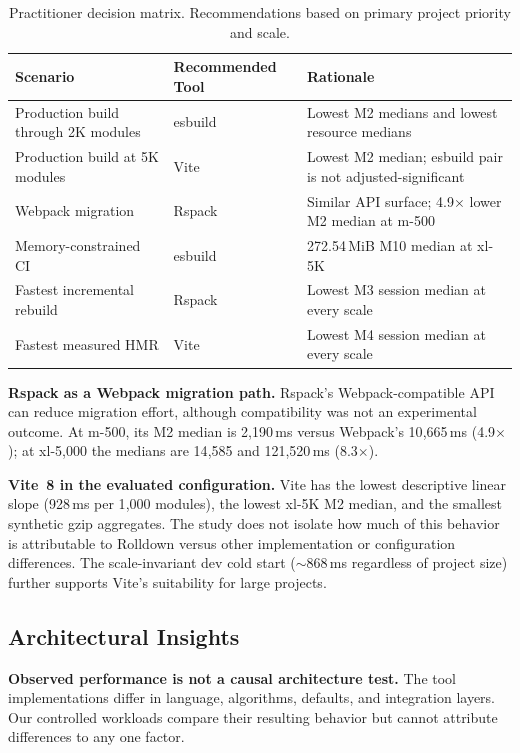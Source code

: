 \documentclass[preprint,12pt]{elsarticle}
\begin{document}
\begin{table}[htbp]
\centering
\caption{Practitioner decision matrix. Recommendations based on primary project priority and scale.}\label{tab:decision}
\begin{tabular}{@{}lll@{}}
\toprule
\textbf{Scenario} & \textbf{Recommended Tool} & \textbf{Rationale} \\
\midrule
Production build through 2K modules & esbuild & Lowest M2 medians and lowest resource medians \\
Production build at 5K modules & Vite & Lowest M2 median; esbuild pair is not adjusted-significant \\
Webpack migration & Rspack & Similar API surface; 4.9$\times$ lower M2 median at m-500 \\
Memory-constrained CI & esbuild & 272.54\,MiB M10 median at xl-5K \\
Fastest incremental rebuild & Rspack & Lowest M3 session median at every scale \\
Fastest measured HMR & Vite & Lowest M4 session median at every scale \\
\bottomrule
\end{tabular}
\end{table}

\textbf{Rspack as a Webpack migration path.}
Rspack's Webpack-compatible API can reduce migration effort, although compatibility was not an experimental outcome.
At m-500, its M2 median is 2{,}190\,ms versus Webpack's 10{,}665\,ms (4.9$\times$); at xl-5{,}000 the medians are 14{,}585 and 121{,}520\,ms (8.3$\times$).

\textbf{Vite~8 in the evaluated configuration.}
Vite has the lowest descriptive linear slope (928\,ms per 1{,}000 modules), the lowest xl-5K M2 median, and the smallest synthetic gzip aggregates.
The study does not isolate how much of this behavior is attributable to Rolldown versus other implementation or configuration differences.
The scale-invariant dev cold start ($\sim$868\,ms regardless of project size) further supports Vite's suitability for large projects.

\subsection{Architectural Insights}\label{sec:arch}

\textbf{Observed performance is not a causal architecture test.}
The tool implementations differ in language, algorithms, defaults, and integration layers.
Our controlled workloads compare their resulting behavior but cannot attribute differences to any one factor.
\end{document}
